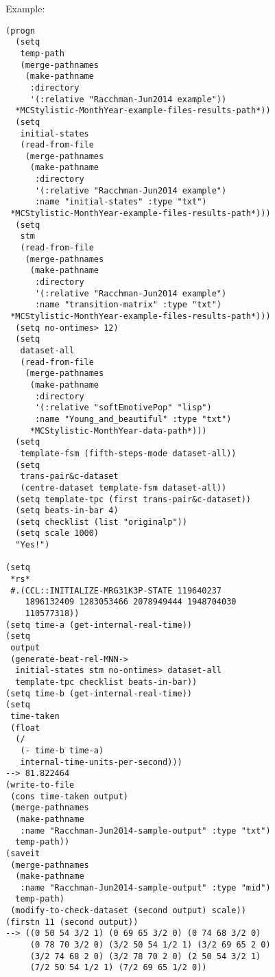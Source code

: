 \vspace{0.5cm}
\noindent Example:
\begin{verbatim}
(progn
  (setq
   temp-path
   (merge-pathnames
    (make-pathname
     :directory
     '(:relative "Racchman-Jun2014 example"))
  *MCStylistic-MonthYear-example-files-results-path*))
  (setq
   initial-states
   (read-from-file
    (merge-pathnames
     (make-pathname
      :directory
      '(:relative "Racchman-Jun2014 example")
      :name "initial-states" :type "txt")
 *MCStylistic-MonthYear-example-files-results-path*)))
  (setq
   stm
   (read-from-file
    (merge-pathnames
     (make-pathname
      :directory
      '(:relative "Racchman-Jun2014 example")
      :name "transition-matrix" :type "txt")
 *MCStylistic-MonthYear-example-files-results-path*)))
  (setq no-ontimes> 12)
  (setq
   dataset-all
   (read-from-file
    (merge-pathnames
     (make-pathname
      :directory
      '(:relative "softEmotivePop" "lisp")
      :name "Young_and_beautiful" :type "txt")
     *MCStylistic-MonthYear-data-path*)))
  (setq
   template-fsm (fifth-steps-mode dataset-all))
  (setq
   trans-pair&c-dataset
   (centre-dataset template-fsm dataset-all))
  (setq template-tpc (first trans-pair&c-dataset))
  (setq beats-in-bar 4)
  (setq checklist (list "originalp"))
  (setq scale 1000)
  "Yes!")

(setq
 *rs*
 #.(CCL::INITIALIZE-MRG31K3P-STATE 119640237
    1896132409 1283053466 2078949444 1948704030
    110577318))
(setq time-a (get-internal-real-time))
(setq
 output
 (generate-beat-rel-MNN->
  initial-states stm no-ontimes> dataset-all
  template-tpc checklist beats-in-bar))
(setq time-b (get-internal-real-time))
(setq
 time-taken
 (float
  (/
   (- time-b time-a)
   internal-time-units-per-second)))
--> 81.822464
(write-to-file
 (cons time-taken output)
 (merge-pathnames
  (make-pathname
   :name "Racchman-Jun2014-sample-output" :type "txt")
  temp-path))
(saveit
 (merge-pathnames
  (make-pathname
   :name "Racchman-Jun2014-sample-output" :type "mid")
  temp-path)
 (modify-to-check-dataset (second output) scale))
(firstn 11 (second output))
--> ((0 50 54 3/2 1) (0 69 65 3/2 0) (0 74 68 3/2 0)
     (0 78 70 3/2 0) (3/2 50 54 1/2 1) (3/2 69 65 2 0)
     (3/2 74 68 2 0) (3/2 78 70 2 0) (2 50 54 3/2 1)
     (7/2 50 54 1/2 1) (7/2 69 65 1/2 0))
\end{verbatim}

